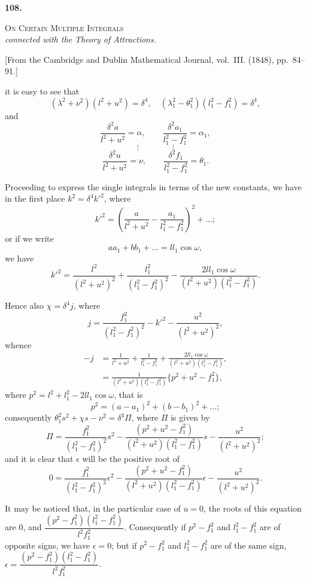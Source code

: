 \documentclass[11pt]{article}
\newcommand{\source}[1]{%
  \begin{center}
    \small #1
  \end{center}
  \vspace{0.5em}
}
\begin{document}
\thispagestyle{empty}

\noindent\textbf{108.}\\[0.3em]
\begin{center}
\textsc{On Certain Multiple Integrals}\\[0.2em]
\textit{connected with the Theory of Attractions.}
\end{center}
\source{[From the Cambridge and Dublin Mathematical Journal, vol.~III. (1848), pp.~84--91.]}

it is easy to see that
\[
(\lambda^2 + \nu^2)(l^2 + u^2) = \delta^4, \quad (\lambda_1^2 - \theta_1^2)(l_1^2 - f_1^2) = \delta^4,
\]
and
\[
\frac{\delta^2 a}{l^2 + u^2} = \alpha, \qquad \frac{\delta^2 a_1}{l_1^2 - f_1^2} = \alpha_1,
\]
\[
\vdots \qquad \qquad \vdots
\]
\[
\frac{\delta^2 u}{l^2 + u^2} = \nu, \qquad \frac{\delta^2 f_1}{l_1^2 - f_1^2} = \theta_1.
\]

Proceeding to express the single integrals in terms of the new constants, we have in the first place $k^2 = \delta^4 k'^2$, where
\[
k'^2 = \left(\frac{a}{l^2+u^2} - \frac{a_1}{l_1^2-f_1^2}\right)^2 + \ldots;
\]
or if we write
\[
aa_1 + bb_1 + \ldots = ll_1 \cos \omega,
\]
we have
\[
k'^2 = \frac{l^2}{(l^2+u^2)^2} + \frac{l_1^2}{(l_1^2-f_1^2)^2} - \frac{2ll_1 \cos \omega}{(l^2+u^2)(l_1^2-f_1^2)}.
\]

Hence also $\chi = \delta^4 j$, where
\[
j = \frac{f_1^2}{(l_1^2-f_1^2)^2} - k'^2 - \frac{u^2}{(l^2+u^2)^2},
\]
whence
\begin{align*}
-j &= \frac{1}{l^2+u^2} + \frac{1}{l_1^2-f_1^2} + \frac{2ll_1 \cos \omega}{(l^2+u^2)(l_1^2-f_1^2)},\\
&= \frac{1}{(l^2+u^2)(l_1^2-f_1^2)} \{p^2 + u^2 - f_1^2\},
\end{align*}
where $p^2 = l^2 + l_1^2 - 2ll_1 \cos \omega$, that is
\[
p^2 = (a-a_1)^2 + (b-b_1)^2 + \ldots;
\]
consequently $\theta_1^2 s^2 + \chi s - \nu^2 = \delta^4 \Pi$, where $\Pi$ is given by
\[
\Pi = \frac{f_1^2}{(l_1^2-f_1^2)^2} s^2 - \frac{(p^2+u^2-f_1^2)}{(l^2+u^2)(l_1^2-f_1^2)} s - \frac{u^2}{(l^2+u^2)^2};
\]
and it is clear that $\epsilon$ will be the positive root of
\[
0 = \frac{f_1^2}{(l_1^2-f_1^2)^2} \epsilon^2 - \frac{(p^2+u^2-f_1^2)}{(l^2+u^2)(l_1^2-f_1^2)} \epsilon - \frac{u^2}{(l^2+u^2)^2}.
\]

It may be noticed that, in the particular case of $u = 0$, the roots of this equation are $0$, and $\dfrac{(p^2-f_1^2)(l_1^2-f_1^2)}{l^2 f_1^2}$. Consequently if $p^2-f_1^2$ and $l_1^2-f_1^2$ are of opposite signs, we have $\epsilon = 0$; but if $p^2-f_1^2$ and $l_1^2-f_1^2$ are of the same sign, $\epsilon = \dfrac{(p^2-f_1^2)(l_1^2-f_1^2)}{l^2 f_1^2}$.
\end{document}
